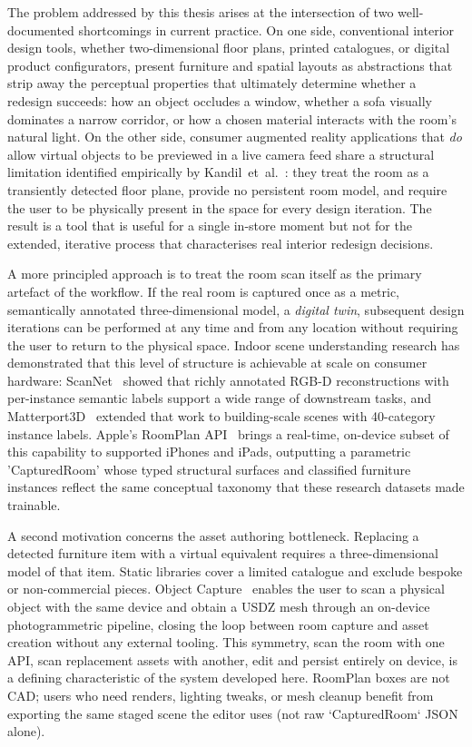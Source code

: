 The problem addressed by this thesis arises at the intersection of two
well-documented shortcomings in current practice. On one side, conventional
interior design tools, whether two-dimensional floor plans, printed catalogues,
or digital product configurators, present furniture and spatial layouts as
abstractions that strip away the perceptual properties that ultimately determine
whether a redesign succeeds: how an object occludes a window, whether a sofa
visually dominates a narrow corridor, or how a chosen material interacts with
the room's natural light. On the other side, consumer augmented reality
applications that \emph{do} allow virtual objects to be previewed in a live
camera feed share a structural limitation identified empirically by
Kandil~et~al.~\cite{kandil2021ux}: they treat the room as a transiently
detected floor plane, provide no persistent room model, and require the user
to be physically present in the space for every design iteration. The result
is a tool that is useful for a single in-store moment but not for the extended,
iterative process that characterises real interior redesign decisions.

A more principled approach is to treat the room scan itself as the primary
artefact of the workflow. If the real room is captured once as a metric,
semantically annotated three-dimensional model, a \emph{digital twin}, subsequent
design iterations can be performed at any time and from any location without
requiring the user to return to the physical space. Indoor scene understanding
research has demonstrated that this level of structure is achievable at scale
on consumer hardware: ScanNet~\cite{dai2017scannet} showed that richly annotated
RGB-D reconstructions with per-instance semantic labels support a wide range of
downstream tasks, and Matterport3D~\cite{CAS+17} extended that work to
building-scale scenes with 40-category instance labels. Apple's RoomPlan
API~\cite{apple2024roomplan2} brings a real-time, on-device subset of this
capability to supported iPhones and iPads, outputting a parametric
'CapturedRoom' whose typed structural surfaces and classified furniture
instances reflect the same conceptual taxonomy that these research datasets
made trainable.

A second motivation concerns the asset authoring bottleneck. Replacing a
detected furniture item with a virtual equivalent requires a three-dimensional
model of that item. Static libraries cover a limited catalogue and exclude
bespoke or non-commercial pieces. Object Capture~\cite{apple2024roomplan2}
enables the user to scan a physical object with the same device and obtain a
USDZ mesh through an on-device photogrammetric pipeline, closing the loop
between room capture and asset creation without any external tooling. This
symmetry, scan the room with one API, scan replacement assets with another,
edit and persist entirely on device, is a defining characteristic of the
system developed here. RoomPlan boxes are not CAD; users who need renders, lighting tweaks, or mesh cleanup benefit from exporting the same staged scene the editor uses (not raw `CapturedRoom` JSON alone).


